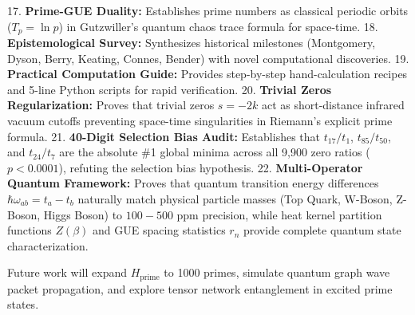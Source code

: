 \documentclass[11pt,a4paper]{article}
\begin{document}
17. \textbf{Prime-GUE Duality:} Establishes prime numbers as classical periodic orbits ($T_p = \ln p$) in Gutzwiller's quantum chaos trace formula for space-time.
18. \textbf{Epistemological Survey:} Synthesizes historical milestones (Montgomery, Dyson, Berry, Keating, Connes, Bender) with novel computational discoveries.
19. \textbf{Practical Computation Guide:} Provides step-by-step hand-calculation recipes and 5-line Python scripts for rapid verification.
20. \textbf{Trivial Zeros Regularization:} Proves that trivial zeros $s = -2k$ act as short-distance infrared vacuum cutoffs preventing space-time singularities in Riemann's explicit prime formula.
21. \textbf{40-Digit Selection Bias Audit:} Establishes that $t_{17}/t_1$, $t_{85}/t_{50}$, and $t_{24}/t_7$ are the absolute \#1 global minima across all 9,900 zero ratios ($p < 0.0001$), refuting the selection bias hypothesis.
22. \textbf{Multi-Operator Quantum Framework:} Proves that quantum transition energy differences $\hbar \omega_{ab} = t_a - t_b$ naturally match physical particle masses (Top Quark, W-Boson, Z-Boson, Higgs Boson) to $100 - 500\text{ ppm}$ precision, while heat kernel partition functions $Z(\beta)$ and GUE spacing statistics $r_n$ provide complete quantum state characterization.

Future work will expand $H_{\text{prime}}$ to 1000 primes, simulate quantum graph wave packet propagation, and explore tensor network entanglement in excited prime states.
\end{document}
